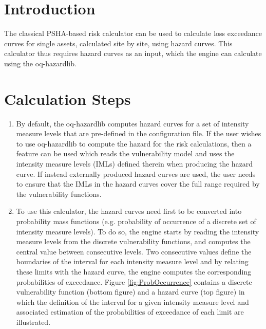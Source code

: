 \section{Introduction}
The classical PSHA-based risk calculator can be used to calculate loss exceedance curves for single \glspl{asset}, calculated site by site, using hazard curves. This calculator thus requires hazard curves as an input, which the engine can calculate using the oq-hazardlib.

\section{Calculation Steps}

\begin{enumerate}

\item By default, the oq-hazardlib computes hazard curves for a set of intensity measure levels that are pre-defined in the configuration file. If the user wishes to use oq-hazardlib to compute the hazard for the risk calculations, then a feature can be used which reads the \gls{vulnerability model} and uses the intensity measure levels (IMLs) defined therein when producing the hazard curve. If instead externally produced hazard curves are used, the user needs to ensure that the IMLs in the hazard curves cover the full range required by the \glspl{vulnerability function}. 

\item To use this calculator, the hazard curves need first to be converted into probability mass functions (e.g. probability of occurrence of a discrete set of intensity measure levels). To do so, the engine starts by reading the intensity measure levels from the discrete \glspl{vulnerability function}, and computes the central value between consecutive levels. Two consecutive values define the boundaries of the interval for each intensity measure level and by relating these limits with the hazard curve, the engine computes the corresponding probabilities of exceedance. Figure \ref{fig:ProbOccurrence} contains a discrete \gls{vulnerability function} (bottom figure) and a hazard curve (top figure) in which the definition of the interval for a given intensity measure level and associated estimation of the probabilities of exceedance of each limit are illustrated. 


\end{enumerate}
